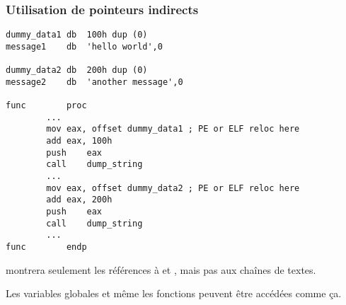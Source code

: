 \subsubsection{Utilisation de pointeurs indirects}

\begin{lstlisting}[style=customasmx86]
dummy_data1	db	100h dup (0)
message1	db	'hello world',0

dummy_data2	db	200h dup (0)
message2	db	'another message',0

func		proc
		...
		mov	eax, offset dummy_data1 ; PE or ELF reloc here
		add	eax, 100h
		push	eax
		call	dump_string
		...
		mov	eax, offset dummy_data2 ; PE or ELF reloc here
		add	eax, 200h
		push	eax
		call	dump_string
		...
func		endp
\end{lstlisting}

\IDA{} montrera seulement les références à  et ,
mais pas aux chaînes de textes.

Les variables globales et même les fonctions peuvent être accédées comme ça.


